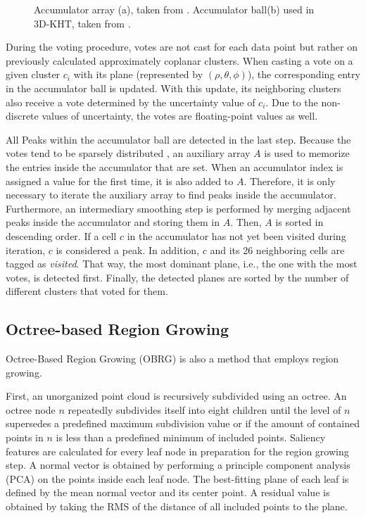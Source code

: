 \documentclass[main.tex]{subfiles}
\begin{document}
\begin{figure}[H]
\begin{subfigure}{0.25\textwidth}
        \caption[3D-KHT Accumulator Ball]{}
        \label{fig:accball}
    \end{subfigure}
    \hspace{\fill}
    \caption[Hough Transform Accumulators]{Accumulator array (a), taken from \cite*[Figure~3]{Borrmann_Elseberg_Lingemann_Nüchter_2011}. Accumulator
        ball(b) used in 3D-KHT, taken from \cite*[Figure~5]{Limberger_Oliveira_2015}.}
\end{figure}

During the voting procedure, votes are not cast for each data point but rather on previously calculated approximately coplanar clusters.
When casting a vote on a given cluster $c_i$ with its plane (represented by $(\rho, \theta, \phi)$), the corresponding entry in the accumulator ball is updated.
With this update, its neighboring clusters also receive a vote determined by the uncertainty value of $c_i$. Due to the non-discrete
values of uncertainty, the votes are floating-point values as well.

All Peaks within the accumulator ball are detected in the last step. Because the votes tend to be sparsely distributed \cite[Section~3.4]{Limberger_Oliveira_2015},
an auxiliary array $A$ is used to memorize the entries inside the accumulator that are set. When an accumulator index is assigned a value for the first time, it is also added to $A$.
Therefore, it is only necessary to iterate the auxiliary array to find peaks inside the accumulator.
Furthermore, an intermediary smoothing step is performed by merging adjacent peaks inside the accumulator and storing them in $A$.
Then, $A$ is sorted in descending order.
If a cell $c$ in the accumulator has not yet been visited during iteration, $c$ is considered a peak. In addition, $c$ and its 26 neighboring cells are tagged as \textit{visited}.
That way, the most dominant plane, i.e., the one with the most votes, is detected first.
Finally, the detected planes are sorted by the number of different clusters that voted for them.

\subsection{Octree-based Region Growing}
\label{subsec:bg-obrg}
Octree-Based Region Growing (OBRG) \cite{Vo_Truong-Hong_Laefer_Bertolotto_2015} is also a method that employs region growing.

First, an unorganized point cloud is recursively subdivided using an octree.
An octree node $n$ repeatedly subdivides itself into eight children until the level of $n$ supersedes a predefined maximum subdivision value or if the
amount of contained points in $n$ is less than a predefined minimum of included points.
Saliency features are calculated for every leaf node in preparation for the region growing step. A normal vector is obtained by performing a principle
component analysis (PCA) on the points inside each leaf node. The best-fitting plane of each leaf is defined by the mean normal vector and its center point.
A residual value is obtained by taking the RMS of the distance of all included points to the plane.
\end{document}
